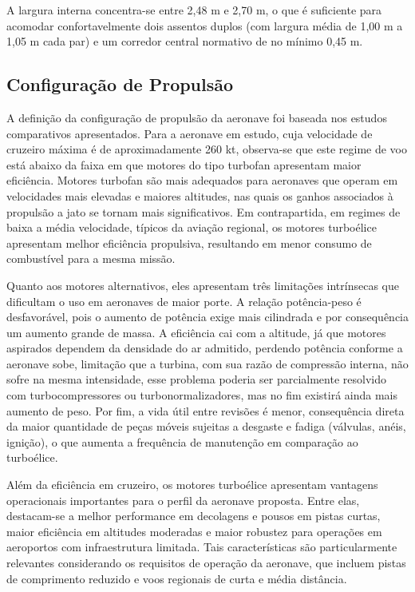 A largura interna concentra-se entre 2,48 m e 2,70 m, o que é suficiente para acomodar confortavelmente dois assentos duplos (com largura média de 1,00 m a 1,05 m cada par) e um corredor central normativo de no mínimo 0,45 m. 

\subsection{Configuração de Propulsão}

A definição da configuração de propulsão da aeronave foi baseada nos estudos comparativos apresentados. Para a aeronave em estudo, cuja velocidade de cruzeiro máxima é de aproximadamente 260 kt, observa-se que este regime de voo está abaixo da faixa em que motores do tipo turbofan apresentam maior eficiência. Motores turbofan são mais adequados para aeronaves que operam em velocidades mais elevadas e maiores altitudes, nas quais os ganhos associados à propulsão a jato se tornam mais significativos. Em contrapartida, em regimes de baixa a média velocidade, típicos da aviação regional, os motores turboélice apresentam melhor eficiência propulsiva, resultando em menor consumo de combustível para a mesma missão.

Quanto aos motores alternativos, eles apresentam três limitações intrínsecas que dificultam o uso em aeronaves de maior porte. A relação potência-peso é desfavorável, pois o aumento de potência exige mais cilindrada e por consequência um aumento grande de massa. A eficiência cai com a altitude, já que motores aspirados dependem da densidade do ar admitido, perdendo potência conforme a aeronave sobe, limitação que a turbina, com sua razão de compressão interna, não sofre na mesma intensidade, esse problema poderia ser parcialmente resolvido com turbocompressores ou turbonormalizadores, mas no fim existirá ainda mais aumento de peso. Por fim, a vida útil entre revisões é menor, consequência direta da maior quantidade de peças móveis sujeitas a desgaste e fadiga (válvulas, anéis, ignição), o que aumenta a frequência de manutenção em comparação ao turboélice.

Além da eficiência em cruzeiro, os motores turboélice apresentam vantagens operacionais importantes para o perfil da aeronave proposta. Entre elas, destacam-se a melhor performance em decolagens e pousos em pistas curtas, maior eficiência em altitudes moderadas e maior robustez para operações em aeroportos com infraestrutura limitada. Tais características são particularmente relevantes considerando os requisitos de operação da aeronave, que incluem pistas de comprimento reduzido e voos regionais de curta e média distância.

